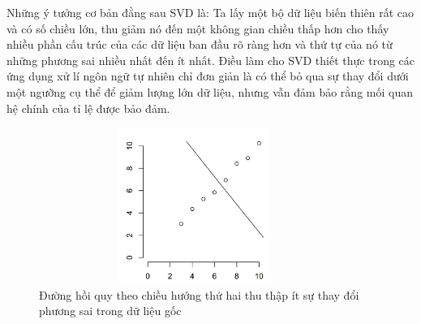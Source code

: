 Những ý tưởng cơ bản đằng sau SVD là: Ta lấy một bộ dữ liệu biến thiên rất cao
và có số chiều lớn, thu giảm nó đến một không gian chiều thấp hơn cho thấy nhiều
phần cấu trúc của các dữ liệu ban đầu rõ ràng hơn và thứ tự của nó từ những
phương sai nhiều nhất đến ít nhất. Điều làm cho SVD thiết thực trong các ứng
dụng xử lí ngôn ngữ tự nhiên chỉ đơn giản là có thể bỏ qua sự thay đổi dưới một
ngưỡng cụ thể để giảm lượng lớn dữ liệu, nhưng vẫn đảm bảo rằng mối quan hệ
chính của tỉ lệ được bảo đảm.\\
\begin{figure}[h!]
	\centering 
	\includegraphics[width=4in,height=2in,keepaspectratio=true]{SVD2.png}
	\caption{Đường hồi quy theo chiều hướng thứ hai thu thập ít sự thay đổi phương
	sai trong dữ liệu gốc}
\end{figure}

